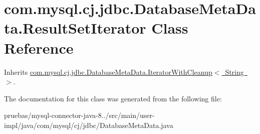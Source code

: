 \hypertarget{classcom_1_1mysql_1_1cj_1_1jdbc_1_1_database_meta_data_1_1_result_set_iterator}{}\section{com.\+mysql.\+cj.\+jdbc.\+Database\+Meta\+Data.\+Result\+Set\+Iterator Class Reference}
\label{classcom_1_1mysql_1_1cj_1_1jdbc_1_1_database_meta_data_1_1_result_set_iterator}


Inherits \mbox{\hyperlink{classcom_1_1mysql_1_1cj_1_1jdbc_1_1_database_meta_data_1_1_iterator_with_cleanup}{com.\+mysql.\+cj.\+jdbc.\+Database\+Meta\+Data.\+Iterator\+With\+Cleanup$<$ String $>$}}.



The documentation for this class was generated from the following file\+:\begin{DoxyCompactItemize}
\item 
pruebas/mysql-\/connector-\/java-\/8../src/main/user-\/impl/java/com/mysql/cj/jdbc/Database\+Meta\+Data.\+java\end{DoxyCompactItemize}
